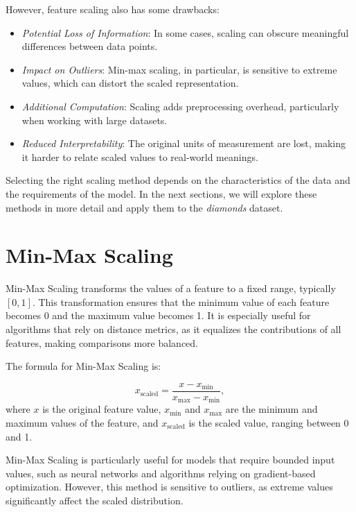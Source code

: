 \documentclass[
]{book}
\providecommand{\tightlist}{%
  \setlength{\itemsep}{0pt}\setlength{\parskip}{0pt}}
\theoremstyle{definition}
\theoremstyle{definition}
\theoremstyle{definition}
\theoremstyle{definition}
\theoremstyle{remark}
\begin{document}
However, feature scaling also has some drawbacks:

\begin{itemize}
\tightlist
\item
  \emph{Potential Loss of Information}: In some cases, scaling can obscure meaningful differences between data points.
\item
  \emph{Impact on Outliers}: Min-max scaling, in particular, is sensitive to extreme values, which can distort the scaled representation.
\item
  \emph{Additional Computation}: Scaling adds preprocessing overhead, particularly when working with large datasets.
\item
  \emph{Reduced Interpretability}: The original units of measurement are lost, making it harder to relate scaled values to real-world meanings.
\end{itemize}

Selecting the right scaling method depends on the characteristics of the data and the requirements of the model. In the next sections, we will explore these methods in more detail and apply them to the \emph{diamonds} dataset.

\section{Min-Max Scaling}\label{min-max-scaling}

Min-Max Scaling transforms the values of a feature to a fixed range, typically \([0, 1]\). This transformation ensures that the minimum value of each feature becomes 0 and the maximum value becomes 1. It is especially useful for algorithms that rely on distance metrics, as it equalizes the contributions of all features, making comparisons more balanced.

The formula for Min-Max Scaling is:

\[
x_{\text{scaled}} = \frac{x - x_{\text{min}}}{x_{\text{max}} - x_{\text{min}}},
\]
where \(x\) is the original feature value, \(x_{\text{min}}\) and \(x_{\text{max}}\) are the minimum and maximum values of the feature, and \(x_{\text{scaled}}\) is the scaled value, ranging between 0 and 1.

Min-Max Scaling is particularly useful for models that require bounded input values, such as neural networks and algorithms relying on gradient-based optimization. However, this method is sensitive to outliers, as extreme values significantly affect the scaled distribution.
\end{document}
